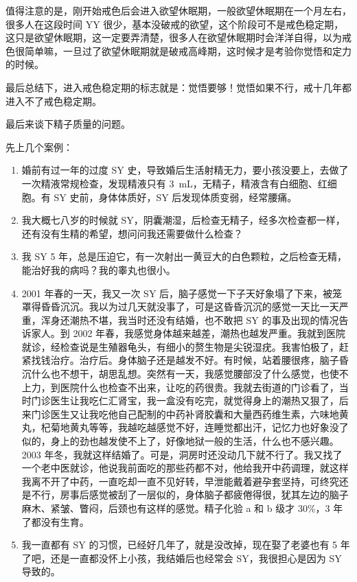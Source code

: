 \documentclass[fontset=founder]{ctexart}
\begin{document}
值得注意的是，刚开始戒色后会进入欲望休眠期，一般欲望休眠期在一个月左右，很多人在这段时间 YY 很少，基本没破戒的欲望，这个阶段可不是戒色稳定期，这只是欲望休眠期，这一定要弄清楚，很多人在欲望休眠期时会洋洋自得，以为戒色很简单嘛，一旦过了欲望休眠期就是破戒高峰期，这时候才是考验你觉悟和定力的时候。

最后总结下，进入戒色稳定期的标志就是：觉悟要够！觉悟如果不行，戒十几年都进入不了戒色稳定期。

最后来谈下精子质量的问题。

先上几个案例：

\begin{enumerate}
    \item 婚前有过一年的过度 SY 史，导致婚后生活射精无力，要小孩没要上，去做了一次精液常规检查，发现精液只有 \SI{3}{\milli\liter}，无精子，精液含有白细胞、红细胞。有 SY 史前，身体体质好，SY 后发现体质变弱，经常腰痛。
    \item 我大概七八岁的时候就 SY，阴囊潮湿，后检查无精子，经多次检查都一样，还有没有生精的希望，想问问我还需要做什么检查？
    \item 我 SY 5 年，总是压迫它，有一次射出一黄豆大的白色颗粒，之后检查无精，能治好我的病吗？我的睾丸也很小。
    \item 2001 年春的一天，我又一次 SY 后，脑子感觉一下子天好象塌了下来，被笼罩得昏昏沉沉。我以为过几天就没事了，可是这昏昏沉沉的感觉一天比一天严重，浑身还潮热不堪，我当时还没有结婚，也不敢把 SY 的事及出现的情况告诉家人。到 2002 年春，我感觉身体越来越差，潮热也越发严重。我就到医院就诊，经检查说是生殖器龟头，有细小的赘生物是尖锐湿疣。我害怕极了，赶紧找钱治疗。治疗后。身体脑子还是越发不好。有时候，站着腰很疼，脑子昏沉什么也不想干，胡思乱想。突然有一天，我感觉腰部没了什么感觉，也使不上力，到医院什么也检查不出来，让吃的药很贵。我就去街道的门诊看了，当时门诊医生让我吃仁汇肾宝，我一盒没有吃完，就觉得身上的潮热又狠了，后来门诊医生又让我吃他自己配制的中药补肾胶囊和大量西药维生素，六味地黄丸，杞菊地黄丸等等，我越吃越感觉不好，连睡觉都出汗，记忆力也好象没了似的，身上的劲也越发使不上了，好像地狱一般的生活，什么也不感兴趣。2003 年冬，我就这样结婚了。可是，洞房时还没动几下就不行了。我又找了一个老中医就诊，他说我前面吃的那些药都不对，他给我开中药调理，就这样我离不开了中药，一直吃却一直不见好转，早泄能戴着避孕套坚持，可终究还是不行，房事后感觉被刮了一层似的，身体脑子都疲倦得很，犹其左边的脑子麻木、紧皱、瞥闷，后颈也有这样的感觉。精子化验 a 和 b 级才 30\%，3 年了都没有生育。
    \item 我一直都有 SY 的习惯，已经好几年了，就是没改掉，现在娶了老婆也有 5 年了吧，还是一直都没怀上小孩，我结婚后也经常会 SY，我很担心是因为 SY 导致的。

\end{enumerate}
\end{document}
